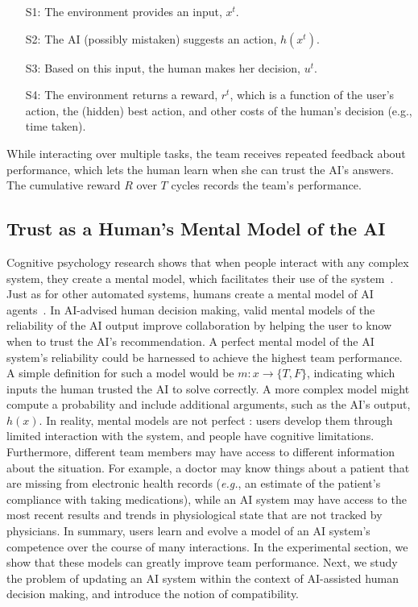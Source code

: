\documentclass[letterpaper]{article}
\newcommand{\eg}{\mbox{\it e.g.}}
\newcommand{\name}{AI-advised human decision making}
\begin{document}
\begin{itemize}[leftmargin=.25in]
\item[S1:] The environment provides an input, $x^t$. 
\item[S2:] The AI (possibly mistaken) suggests an action, $h(x^t)$. 
\item[S3:] Based on this input, the human makes her decision, $u^t$.
\item[S4:] The environment returns a reward, $r^t$, which is a function of the user's action, the (hidden) best action, and other costs of the human's decision (e.g., time taken).
\end{itemize}

\noindent While interacting over multiple tasks, the team receives repeated feedback about performance, which lets the human learn when she can trust the AI's answers. The cumulative reward $R$ over $T$ cycles records the team's performance.


\subsection{Trust as a Human's Mental Model of the AI}

\noindent Cognitive psychology research shows that when people interact with any complex system, they create a mental model, which facilitates their use of the system~\cite{donald1988psychology}. Just as for other automated systems, humans create a mental model of AI agents~\cite{kulesza2012tell}.
In \name, valid mental models of the reliability of the AI output improve collaboration by helping the user to know when to trust the AI's recommendation.
A perfect mental model of the AI system's reliability could be harnessed to achieve the highest team performance. A simple definition for such a model would be $m: x \rightarrow \{T, F\}$, indicating which inputs the human trusted the AI to solve correctly. A more complex model might compute a probability and include additional arguments, such as  the AI's output, $h(x).$
In reality, mental models are not perfect \cite{norman2014some}: users develop them through limited interaction with the system, and people have cognitive limitations.
Furthermore, different team members may have access to different information about the situation. 
For example, a doctor may know things about a patient that are missing from electronic health records (\eg, an estimate of the patient's compliance with taking medications), while an AI system may have access to the most recent results and trends in physiological state that are not tracked by physicians. 
In summary, users learn and evolve a model of an AI system's competence over the course of many interactions. In the experimental section, we show that these models can greatly improve team performance. Next, we study the problem of updating an AI system within the context of AI-assisted human decision making, and introduce the notion of compatibility.
\end{document}
